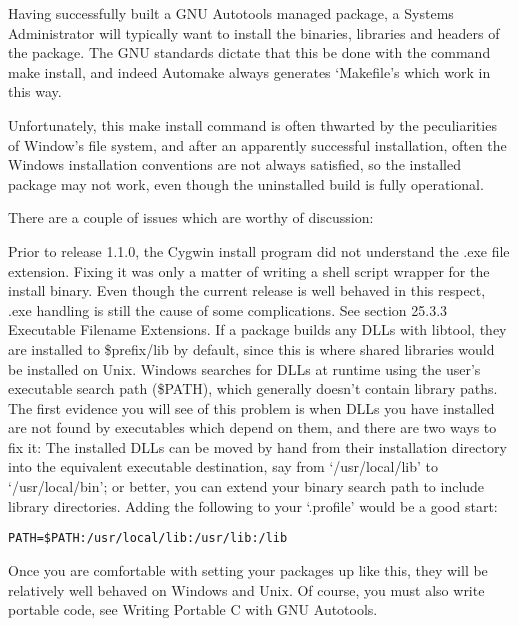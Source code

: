 Having successfully built a GNU Autotools managed package, a Systems Administrator will typically want to install the binaries, libraries and headers of the package. The GNU standards dictate that this be done with the command make install, and indeed Automake always generates `Makefile's which work in this way.

Unfortunately, this make install command is often thwarted by the peculiarities of Window's file system, and after an apparently successful installation, often the Windows installation conventions are not always satisfied, so the installed package may not work, even though the uninstalled build is fully operational.

There are a couple of issues which are worthy of discussion:

Prior to release 1.1.0, the Cygwin install program did not understand 
the .exe file extension. Fixing it was only a matter of writing a shell 
script wrapper for the install binary. Even though the current release is 
well behaved in this respect, .exe handling is still the cause of some 
complications. See section 25.3.3 Executable Filename Extensions. If a 
package builds any DLLs with libtool, they are installed 
to \$prefix/lib by default, since this is where shared libraries would be 
installed on Unix. Windows searches for DLLs at runtime using the user's 
executable search path (\$PATH), which generally doesn't contain 
library paths. The first evidence you will see of this problem is 
when DLLs you have installed are not found by executables which depend on 
them, and there are two ways to fix it: The installed DLLs can be 
moved by hand from their installation directory into the equivalent 
executable destination, say from `/usr/local/lib' to `/usr/local/bin';
or better, you can extend your binary search path to include library 
directories. Adding the following to your `.profile' would be a good start:

 	
\begin{verbatim}
PATH=$PATH:/usr/local/lib:/usr/lib:/lib
\end{verbatim}

Once you are comfortable with setting your packages up like this, they will be relatively well behaved on Windows and Unix. Of course, you must also write portable code, see Writing Portable C with GNU Autotools. 

